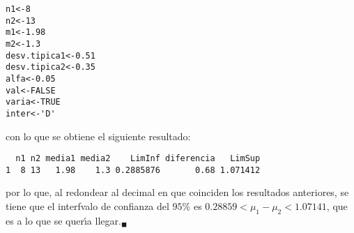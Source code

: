 \begin{solucion}
 \begin{verbatim}
n1<-8
n2<-13
m1<-1.98
m2<-1.3
desv.tipica1<-0.51
desv.tipica2<-0.35
alfa<-0.05
val<-FALSE
varia<-TRUE
inter<-'D'
 \end{verbatim}
 \vspace{-0.5cm}
 con lo que se obtiene el siguiente resultado:
 \begin{verbatim}
  n1 n2 media1 media2    LimInf diferencia   LimSup
1  8 13   1.98    1.3 0.2885876       0.68 1.071412
 \end{verbatim}
 \vspace{-0.5cm}
 por lo que, al redondear al decimal en que coinciden los resultados anteriores, se tiene que el interfvalo de confianza del $95\%$ es $0.28859 < \mu_1 - \mu_2 < 1.07141$, que es a lo que se quer\'{\i}a llegar.${}_{\blacksquare}$
\end{solucion}
